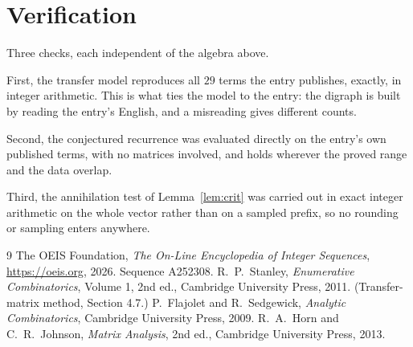 \documentclass[11pt,a4paper]{article}
\theoremstyle{plain}
\theoremstyle{definition}
\begin{document}
\section{Verification}

Three checks, each independent of the algebra above.

First, the transfer model reproduces all $29$ terms the entry publishes, exactly, in
integer arithmetic. This is what ties the model to the entry: the digraph is built by reading
the entry's English, and a misreading gives different counts.

Second, the conjectured recurrence was evaluated directly on the entry's own published terms,
with no matrices involved, and holds wherever the proved range and the data overlap.

Third, the annihilation test of Lemma~\ref{lem:crit} was carried out in exact integer
arithmetic on the whole vector rather than on a sampled prefix, so no rounding or sampling
enters anywhere.

\begin{thebibliography}{9}
 The OEIS Foundation, \emph{The On-Line Encyclopedia of Integer
Sequences}, \url{https://oeis.org}, 2026. Sequence A252308.
 R.~P.~Stanley, \emph{Enumerative Combinatorics}, Volume 1, 2nd ed.,
Cambridge University Press, 2011. (Transfer-matrix method, Section 4.7.)
 P.~Flajolet and R.~Sedgewick, \emph{Analytic Combinatorics}, Cambridge
University Press, 2009.
 R.~A.~Horn and C.~R.~Johnson, \emph{Matrix Analysis}, 2nd ed., Cambridge
University Press, 2013.
\end{thebibliography}
\end{document}
